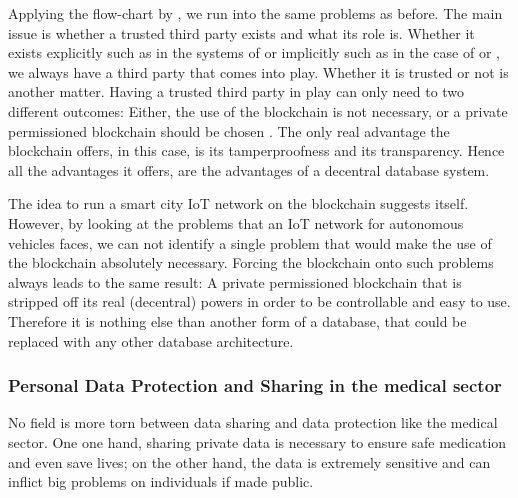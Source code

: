 Applying the flow-chart by \citeauthor{Wust2017}, we run into the same problems as before. The main issue is whether a trusted third party exists and what its role is. Whether it exists explicitly such as in the systems of \cite{Sharma2017} or implicitly such as in the case of \cite{Rowan2017} or \cite{DorriSteger2017}, we always have a third party that comes into play. Whether it is trusted or not is another matter.
Having a trusted third party in play can only need to two different outcomes: Either, the use of the blockchain is not necessary, or a private permissioned blockchain should be chosen \cite{Wust2017}.
The only real advantage the blockchain offers, in this case, is its tamperproofness and its transparency. Hence all the advantages it offers, are the advantages of a decentral database system.

The idea to run a smart city IoT network on the blockchain suggests itself.
However, by looking at the problems that an IoT network for autonomous vehicles faces, we can not identify a single problem that would make the use of the blockchain absolutely necessary. Forcing the blockchain onto such problems always leads to the same result: A private permissioned blockchain that is stripped off its real (decentral) powers in order to be controllable and easy to use. Therefore it is nothing else than another form of a database, that could be replaced with any other database architecture.

\subsubsection{Personal Data Protection and Sharing in the medical sector}
No field is more torn between data sharing and data protection like the medical sector. One one hand, sharing private data is necessary to ensure safe medication and even save lives; on the other hand, the data is extremely sensitive and can inflict big problems on individuals if made public.

